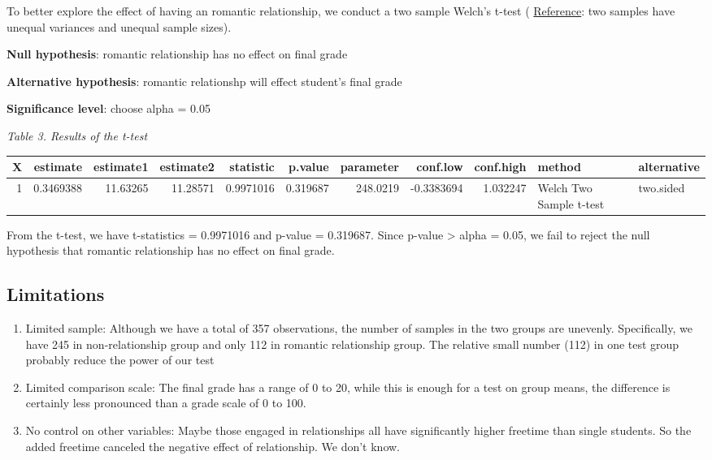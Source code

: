 \documentclass[]{article}
\begin{document}
To better explore the effect of having an romantic relationship, we
conduct a two sample Welch's t-test (
\href{https://en.wikipedia.org/wiki/Welch\%27s_t-test}{Reference}: two
samples have unequal variances and unequal sample sizes).

\textbf{Null hypothesis}: romantic relationship has no effect on final
grade

\textbf{Alternative hypothesis}: romantic relationshp will effect
student's final grade

\textbf{Significance level}: choose alpha = 0.05

\emph{Table 3. Results of the t-test}

\begin{longtable}[]{@{}rrrrrrrrrll@{}}
\toprule
X & estimate & estimate1 & estimate2 & statistic & p.value & parameter &
conf.low & conf.high & method & alternative\tabularnewline
\midrule
\endhead
1 & 0.3469388 & 11.63265 & 11.28571 & 0.9971016 & 0.319687 & 248.0219 &
-0.3383694 & 1.032247 & Welch Two Sample t-test &
two.sided\tabularnewline
\bottomrule
\end{longtable}

From the t-test, we have t-statistics = 0.9971016 and p-value =
0.319687. Since p-value \textgreater{} alpha = 0.05, we fail to reject
the null hypothesis that romantic relationship has no effect on final
grade.

\subsection{Limitations}\label{limitations}

\begin{enumerate}
\def\labelenumi{\arabic{enumi}.}
\item
  Limited sample: Although we have a total of 357 observations, the
  number of samples in the two groups are unevenly. Specifically, we
  have 245 in non-relationship group and only 112 in romantic
  relationship group. The relative small number (112) in one test group
  probably reduce the power of our test
\item
  Limited comparison scale: The final grade has a range of 0 to 20,
  while this is enough for a test on group means, the difference is
  certainly less pronounced than a grade scale of 0 to 100.
\item
  No control on other variables: Maybe those engaged in relationships
  all have significantly higher freetime than single students. So the
  added freetime canceled the negative effect of relationship. We don't
  know.
\end{enumerate}
\end{document}

